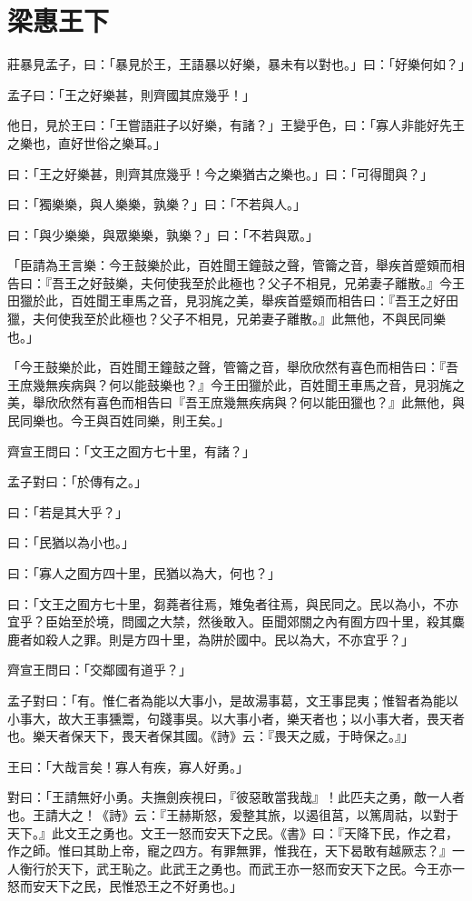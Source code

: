 \documentclass[12pt,a4paper]{ctexbook}
\begin{document}
\section{梁惠王下}
莊暴見孟子，曰：「暴見於王，王語暴以好樂，暴未有以對也。」曰：「好樂何如？」\par
孟子曰：「王之好樂甚，則齊國其庶幾乎！」\par
他日，見於王曰：「王嘗語莊子以好樂，有諸？」王變乎色，曰：「寡人非能好先王之樂也，直好世俗之樂耳。」\par
曰：「王之好樂甚，則齊其庶幾乎！今之樂猶古之樂也。」曰：「可得聞與？」\par
曰：「獨樂樂，與人樂樂，孰樂？」曰：「不若與人。」\par
曰：「與少樂樂，與眾樂樂，孰樂？」曰：「不若與眾。」\par
「臣請為王言樂：今王鼓樂於此，百姓聞王鐘鼓之聲，管籥之音，舉疾首蹙頞而相告曰：『吾王之好鼓樂，夫何使我至於此極也？父子不相見，兄弟妻子離散。』今王田獵於此，百姓聞王車馬之音，見羽旄之美，舉疾首蹙頞而相告曰：『吾王之好田獵，夫何使我至於此極也？父子不相見，兄弟妻子離散。』此無他，不與民同樂也。」\par
「今王鼓樂於此，百姓聞王鐘鼓之聲，管籥之音，舉欣欣然有喜色而相告曰：『吾王庶幾無疾病與？何以能鼓樂也？』今王田獵於此，百姓聞王車馬之音，見羽旄之美，舉欣欣然有喜色而相告曰『吾王庶幾無疾病與？何以能田獵也？』此無他，與民同樂也。今王與百姓同樂，則王矣。」\par
齊宣王問曰：「文王之囿方七十里，有諸？」\par
孟子對曰：「於傳有之。」\par
曰：「若是其大乎？」\par
曰：「民猶以為小也。」\par
曰：「寡人之囿方四十里，民猶以為大，何也？」\par
曰：「文王之囿方七十里，芻蕘者往焉，雉兔者往焉，與民同之。民以為小，不亦宜乎？臣始至於境，問國之大禁，然後敢入。臣聞郊關之內有囿方四十里，殺其麋鹿者如殺人之罪。則是方四十里，為阱於國中。民以為大，不亦宜乎？」\par
齊宣王問曰：「交鄰國有道乎？」\par
孟子對曰：「有。惟仁者為能以大事小，是故湯事葛，文王事昆夷；惟智者為能以小事大，故大王事獯鬻，句踐事吳。以大事小者，樂天者也；以小事大者，畏天者也。樂天者保天下，畏天者保其國。《詩》云：『畏天之威，于時保之。』」\par
王曰：「大哉言矣！寡人有疾，寡人好勇。」\par
對曰：「王請無好小勇。夫撫劍疾視曰，『彼惡敢當我哉』！此匹夫之勇，敵一人者也。王請大之！《詩》云：『王赫斯怒，爰整其旅，以遏徂莒，以篤周祜，以對于天下。』此文王之勇也。文王一怒而安天下之民。《書》曰：『天降下民，作之君，作之師。惟曰其助上帝，寵之四方。有罪無罪，惟我在，天下曷敢有越厥志？』一人衡行於天下，武王恥之。此武王之勇也。而武王亦一怒而安天下之民。今王亦一怒而安天下之民，民惟恐王之不好勇也。」\par
\end{document}
